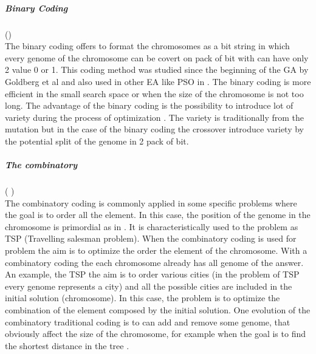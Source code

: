 \subparagraph*{Binary Coding}(\cite{ 73*wright1991, 95*miller1995,97*goldberg1985,123*owais2008, 131*walters1995})  
\\The binary coding offers to format the chromosomes as a bit string in which every genome of the chromosome can be covert on pack of bit with can have only 2 value 0 or 1. This coding method was studied since the beginning of the GA by Goldberg et al  \cite{97*goldberg1985} and also used in other EA like PSO in \cite{87*morsly2012}. The binary coding is more efficient in the small search space or when the size of the chromosome is not too long. The advantage of the binary coding is the possibility to introduce lot of variety during the process of optimization \cite{73*wright1991}. The variety is traditionally from the mutation but in the case of the binary coding the crossover introduce variety by the potential split of the genome in 2 pack of bit.
\\
\subparagraph*{The combinatory }(\cite{ 80*serpell2010,110*eiben2003} )
\\The combinatory coding is commonly applied in some specific problems where the goal is to order all the element. In this case, the position of the genome in the chromosome is primordial as in \cite{ 110*eiben2003}. It is characteristically used to the problem as TSP \cite{80*serpell2010} (Travelling salesman problem).  When the combinatory coding is used for problem the aim is to optimize the order the element of the chromosome. With a combinatory coding the each chromosome already has all genome of the answer. An example, the TSP the aim is to order various cities (in the problem of TSP every genome represents a city) and all the possible cities are included in the initial solution (chromosome). In this case, the problem is to optimize the combination of the element composed by the initial solution. 
One evolution of the combinatory traditional coding is to can add and remove some genome, that obviously affect the size of the chromosome, for example  when the goal is to find the shortest distance in the tree \cite{113*mais2010}. \\

